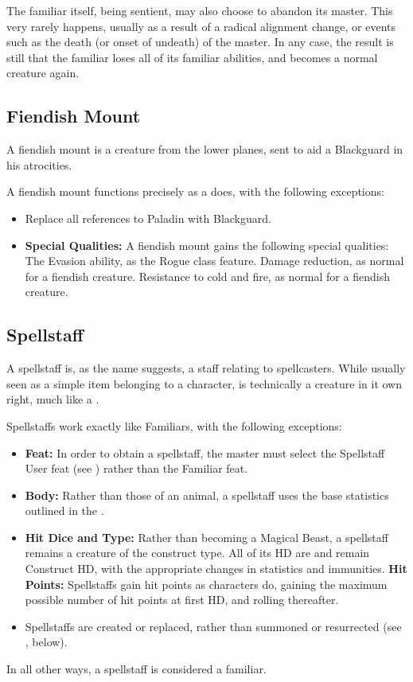 The familiar itself, being sentient, may also choose to abandon its master.
This very rarely happens, usually as a result of a radical alignment change, or events such as the death (or onset of undeath) of the master.
In any case, the result is still that the familiar loses all of its familiar abilities, and becomes a normal creature again.
\subsection{Fiendish Mount}
\label{sec:FiendishMount}
A fiendish mount is a creature from the lower planes, sent to aid a Blackguard in his atrocities. 

A fiendish mount functions precisely as a  does, with the following exceptions:
\begin{itemize}
 \item Replace all references to Paladin with Blackguard.
 \item \textbf{Special Qualities:} A fiendish mount gains the following special qualities:
 \subitem The Evasion ability, as the Rogue class feature.
 \subitem Damage reduction, as normal for a fiendish creature.
 \subitem Resistance to cold and fire, as normal for a fiendish creature.
\end{itemize}

\subsection{Spellstaff}
\label{sec:SpellStaff}
A spellstaff is, as the name suggests, a staff relating to spellcasters.
While usually seen as a simple item belonging to a character, is technically a creature in it own right, much like a .

Spellstaffs work exactly like Familiars, with the following exceptions:
\begin{itemize}
 \item \textbf{Feat:} In order to obtain a spellstaff, the master must select the Spellstaff User feat (see ) rather than the Familiar feat.
 \item \textbf{Body:} Rather than those of an animal, a spellstaff uses the base statistics outlined in the .
 \item \textbf{Hit Dice and Type:} Rather than becoming a Magical Beast, a spellstaff remains a creature of the construct type. 
 All of its HD are and remain Construct HD, with the appropriate changes in statistics and immunities.
 \subitem \textbf{Hit Points:} Spellstaffs gain hit points as characters do, gaining the maximum possible number of hit points at first HD, 
 and rolling thereafter.
 \item Spellstaffs are created or replaced, rather than summoned or resurrected (see , below).
\end{itemize}
In all other ways, a spellstaff is considered a familiar.

